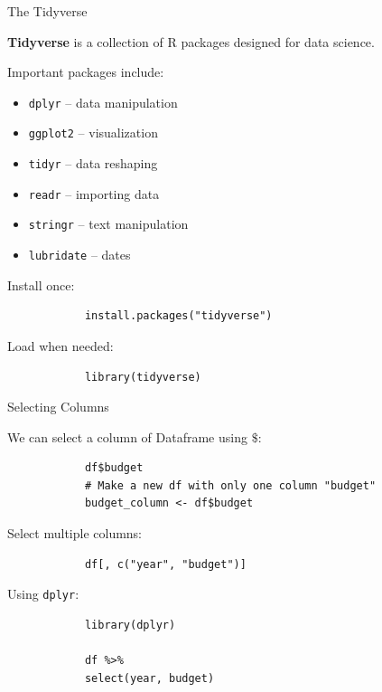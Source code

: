 \documentclass[aspectratio=169,11pt]{beamer}
\begin{document}
	\begin{frame}[fragile]{The Tidyverse}
		
		\textbf{Tidyverse} is a collection of R packages designed for
		data science.
		
		Important packages include:
		
		\begin{itemize}
			\item \texttt{dplyr} -- data manipulation
			\item \texttt{ggplot2} -- visualization
			\item \texttt{tidyr} -- data reshaping
			\item \texttt{readr} -- importing data
			\item \texttt{stringr} -- text manipulation
			\item \texttt{lubridate} -- dates
		\end{itemize}
		
		Install once: 
		
		\begin{lstlisting}
			install.packages("tidyverse")
		\end{lstlisting}
		
		Load when needed:
		
		\begin{lstlisting}
			library(tidyverse)
		\end{lstlisting}
		
	\end{frame}
	
	
	\begin{frame}[fragile]{Selecting Columns}
		
		We can select a column of Dataframe using \(\boxed{\texttt{\$}}\):
		
		\begin{lstlisting}
			df$budget
			# Make a new df with only one column "budget"
			budget_column <- df$budget
		\end{lstlisting}
		
		Select multiple columns:
		
		\begin{lstlisting}
			df[, c("year", "budget")]
		\end{lstlisting}
		
		Using \texttt{dplyr}:
		
		\begin{lstlisting}
			library(dplyr)
			
			df %>%
			select(year, budget)
		\end{lstlisting}
		
	\end{frame}
	
\end{document}

